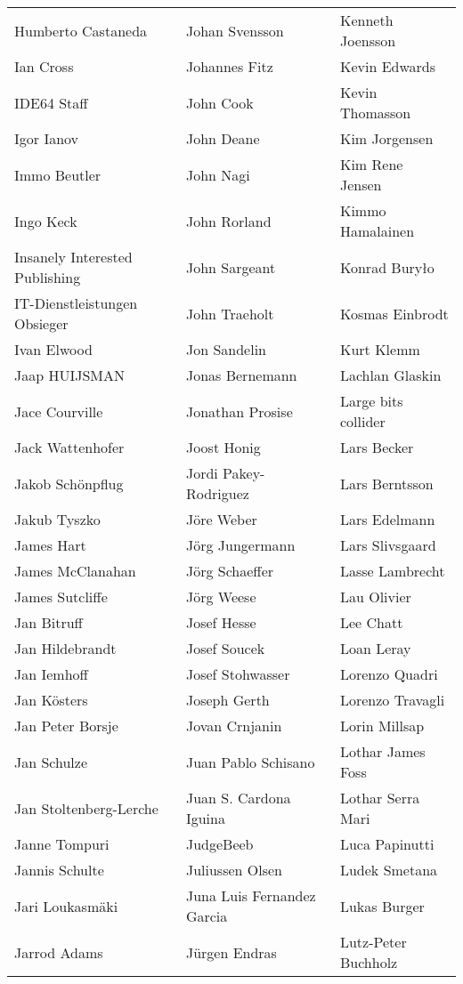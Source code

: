 \begin{tabular}{p{4.5cm}p{4.5cm}p{4.5cm}}
Humberto Castaneda & Johan Svensson & Kenneth Joensson \\
Ian Cross & Johannes Fitz & Kevin Edwards \\
IDE64 Staff & John Cook & Kevin Thomasson \\
Igor Ianov & John Deane & Kim Jorgensen \\
Immo Beutler & John Nagi & Kim Rene Jensen \\
Ingo Keck & John Rorland & Kimmo Hamalainen \\
Insanely Interested Publishing & John Sargeant & Konrad Buryło \\
IT-Dienstleistungen Obsieger & John Traeholt & Kosmas Einbrodt \\
Ivan Elwood & Jon Sandelin & Kurt Klemm \\
Jaap HUIJSMAN & Jonas Bernemann & Lachlan Glaskin \\
Jace Courville & Jonathan Prosise & Large bits collider \\
Jack Wattenhofer & Joost Honig & Lars Becker \\
Jakob Schönpflug & Jordi Pakey-Rodriguez & Lars Berntsson \\
Jakub Tyszko & Jöre Weber & Lars Edelmann \\
James Hart & Jörg Jungermann & Lars Slivsgaard \\
James McClanahan & Jörg Schaeffer & Lasse Lambrecht \\
James Sutcliffe & Jörg Weese & Lau Olivier \\
Jan Bitruff & Josef Hesse & Lee Chatt \\
Jan Hildebrandt & Josef Soucek & Loan Leray \\
Jan Iemhoff & Josef Stohwasser & Lorenzo Quadri \\
Jan Kösters & Joseph Gerth & Lorenzo Travagli \\
Jan Peter Borsje & Jovan Crnjanin & Lorin Millsap \\
Jan Schulze & Juan Pablo Schisano & Lothar James Foss \\
Jan Stoltenberg-Lerche & Juan S. Cardona Iguina & Lothar Serra Mari \\
Janne Tompuri & JudgeBeeb & Luca Papinutti \\
Jannis Schulte & Juliussen Olsen & Ludek Smetana \\
Jari Loukasmäki & Juna Luis Fernandez Garcia & Lukas Burger \\
Jarrod Adams & Jürgen Endras & Lutz-Peter Buchholz \\

\end{tabular}
